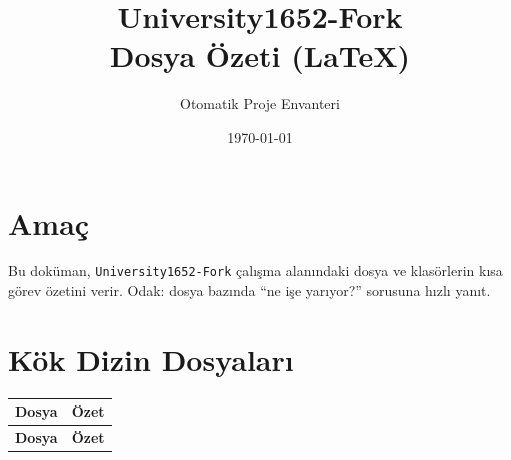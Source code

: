 \documentclass[11pt,a4paper]{article}
\title{University1652-Fork\\Dosya Özeti (LaTeX)}
\author{Otomatik Proje Envanteri}
\date{\today}
\begin{document}
\maketitle

\section*{Amaç}
Bu doküman, \texttt{University1652-Fork} çalışma alanındaki dosya ve klasörlerin kısa görev özetini verir.
Odak: dosya bazında ``ne işe yarıyor?'' sorusuna hızlı yanıt.

\section*{Kök Dizin Dosyaları}
\begin{longtable}{|p{}|p{}|}
\hline
\textbf{Dosya} & \textbf{Özet} \\
\hline
\endfirsthead
\hline
\textbf{Dosya} & \textbf{Özet} \\
\hline
\endhead


\end{longtable}
\end{document}
